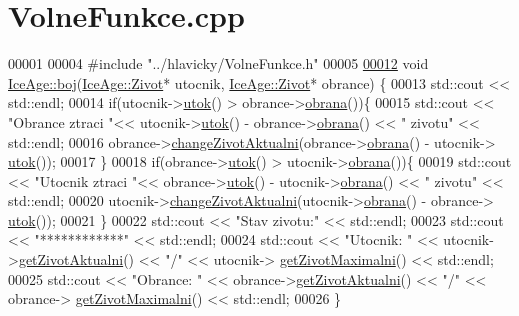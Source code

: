 \hypertarget{VolneFunkce_8cpp_source}{}\section{Volne\+Funkce.\+cpp}
\label{VolneFunkce_8cpp_source}

\begin{DoxyCode}
00001 
00004 \textcolor{preprocessor}{#include "../hlavicky/VolneFunkce.h"}
00005 
\hypertarget{VolneFunkce_8cpp_source.tex_l00012}{}\hyperlink{namespaceIceAge_a2c6b97286bcd54e3ecf2fdc335460e90}{00012} \textcolor{keywordtype}{void} \hyperlink{namespaceIceAge_a2c6b97286bcd54e3ecf2fdc335460e90}{IceAge::boj}(\hyperlink{classIceAge_1_1Zivot}{IceAge::Zivot}* utocnik, \hyperlink{classIceAge_1_1Zivot}{IceAge::Zivot}* obrance) \{
00013     std::cout << std::endl;
00014     \textcolor{keywordflow}{if}(utocnik->\hyperlink{classIceAge_1_1Zivot_a8cb36d6191c9e77a97d90833b6f0824d}{utok}() > obrance->\hyperlink{classIceAge_1_1Zivot_a7d712f401ea189ed382f5cf05869a37a}{obrana}())\{
00015         std::cout << \textcolor{stringliteral}{"Obrance ztraci "}<< utocnik->\hyperlink{classIceAge_1_1Zivot_a8cb36d6191c9e77a97d90833b6f0824d}{utok}() - obrance->\hyperlink{classIceAge_1_1Zivot_a7d712f401ea189ed382f5cf05869a37a}{obrana}() << \textcolor{stringliteral}{" zivotu"} << 
      std::endl;
00016         obrance->\hyperlink{classIceAge_1_1Zivot_a980dc5a5af6d14c23ecca025e3ec7485}{changeZivotAktualni}(obrance->\hyperlink{classIceAge_1_1Zivot_a7d712f401ea189ed382f5cf05869a37a}{obrana}() - utocnik->
      \hyperlink{classIceAge_1_1Zivot_a8cb36d6191c9e77a97d90833b6f0824d}{utok}());
00017     \}
00018     \textcolor{keywordflow}{if}(obrance->\hyperlink{classIceAge_1_1Zivot_a8cb36d6191c9e77a97d90833b6f0824d}{utok}() > utocnik->\hyperlink{classIceAge_1_1Zivot_a7d712f401ea189ed382f5cf05869a37a}{obrana}())\{
00019         std::cout << \textcolor{stringliteral}{"Utocnik ztraci "}<< obrance->\hyperlink{classIceAge_1_1Zivot_a8cb36d6191c9e77a97d90833b6f0824d}{utok}() - utocnik->\hyperlink{classIceAge_1_1Zivot_a7d712f401ea189ed382f5cf05869a37a}{obrana}() << \textcolor{stringliteral}{" zivotu"} << 
      std::endl;
00020         utocnik->\hyperlink{classIceAge_1_1Zivot_a980dc5a5af6d14c23ecca025e3ec7485}{changeZivotAktualni}(utocnik->\hyperlink{classIceAge_1_1Zivot_a7d712f401ea189ed382f5cf05869a37a}{obrana}() - obrance->
      \hyperlink{classIceAge_1_1Zivot_a8cb36d6191c9e77a97d90833b6f0824d}{utok}());
00021     \}
00022     std::cout << \textcolor{stringliteral}{"Stav zivotu:"} << std::endl;
00023     std::cout << \textcolor{stringliteral}{"************"} << std::endl;
00024     std::cout << \textcolor{stringliteral}{"Utocnik: "} << utocnik->\hyperlink{classIceAge_1_1Zivot_ae4e3a167722a80ccace3985f183ddd8d}{getZivotAktualni}() << \textcolor{stringliteral}{"/"} << utocnik->
      \hyperlink{classIceAge_1_1Zivot_a75a65879dd6ddc0bc3e402ac6f613813}{getZivotMaximalni}() << std::endl;
00025     std::cout << \textcolor{stringliteral}{"Obrance: "} << obrance->\hyperlink{classIceAge_1_1Zivot_ae4e3a167722a80ccace3985f183ddd8d}{getZivotAktualni}() << \textcolor{stringliteral}{"/"} << obrance->
      \hyperlink{classIceAge_1_1Zivot_a75a65879dd6ddc0bc3e402ac6f613813}{getZivotMaximalni}() << std::endl;
00026 \}
\end{DoxyCode}
